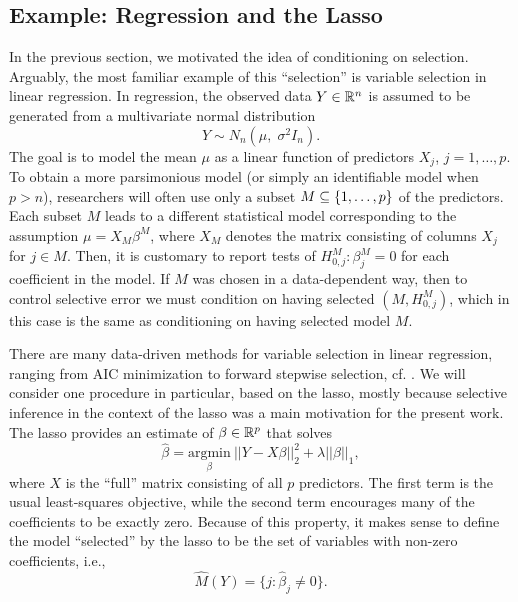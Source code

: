 \documentclass{article}
\theoremstyle{definition}
\newcommand{\bX}{X}
\newcommand{\hM}{\widehat{M}}
\begin{document}
\subsection{Example: Regression and the Lasso}\label{sec:lassoRegression}

In the previous section, we motivated the idea of conditioning on selection. Arguably, the most familiar example of this ``selection'' is variable selection in linear regression. In regression, the observed data $Y \in \mathbb{R}^n$ is assumed to be generated from a multivariate normal distribution
\begin{equation}\label{eq:fullModel}
  Y \sim N_n(\mu, \;\sigma^2 I_n).
\end{equation}
The goal is to model the mean $\mu$ as a linear function of predictors $X_j$, $j=1,\ldots, p$. To obtain a more parsimonious model (or simply an identifiable model when $p > n$), researchers will often use only a subset $M \subseteq\{1,\ldots, p \}$ of the predictors. Each subset $M$ leads to a different statistical model corresponding to the assumption $\mu=\bX_M \beta^{M}$, where $\bX_M$ denotes the matrix consisting of columns $X_j$ for $j\in M$. Then, it is customary to report tests of $H_{0,j}^M: \beta^M_j = 0$ for each coefficient in the model. If $M$ was chosen in a data-dependent way, then to control selective error we must condition on having selected $(M, H_{0,j}^M)$, which in this case is the same as conditioning on having selected model $M$.

There are many data-driven methods for variable selection in linear regression, ranging from AIC minimization to forward stepwise selection, cf. \citet{hastie2009elements}. We will consider one procedure in particular, based on the lasso, mostly because selective inference in the context of the lasso \citep{lee2016exact} was a main motivation for the present work. The lasso \citep{tibshirani1996regression} provides an estimate of $\beta \in \mathbb{R}^p$ that solves
\begin{equation}
\hat\beta = \underset{\beta}{\text{argmin}}\ ||Y - X\beta||_2^2 + \lambda ||\beta||_1,
\end{equation}
where $X$ is the ``full'' matrix consisting of all $p$ predictors. The first term is the usual least-squares objective, while the second term encourages many of the coefficients to be exactly zero. Because of this property, it makes sense to define the model ``selected'' by the lasso to be the set of variables with non-zero coefficients, i.e.,
\[ \hM(Y) = \{ j: \hat\beta_j \neq 0 \}. \]
\end{document}
